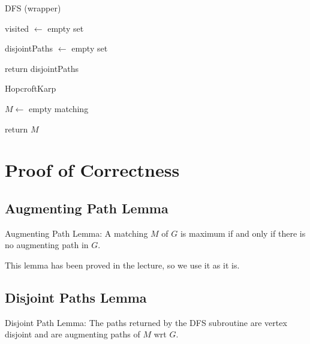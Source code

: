 \documentclass{article}
\begin{document}
\begin{algorithm}[!h]
\caption{DFS (wrapper)}

visited $\leftarrow$ empty set

disjointPaths $\leftarrow$ empty set

return disjointPaths
\end{algorithm}

\begin{algorithm}[!h]
\caption{HopcroftKarp}

$M \leftarrow$ empty matching

return $M$
\end{algorithm}


\section{Proof of Correctness}
\subsection{Augmenting Path Lemma}
Augmenting Path Lemma: A matching $M$ of $G$ is maximum if and only if there is no augmenting path in $G$.

This lemma has been proved in the lecture, so we use it as it is.

\subsection{Disjoint Paths Lemma}
Disjoint Path Lemma: The paths returned by the DFS subroutine are vertex disjoint and are augmenting paths of $M$ wrt $G$.
\end{document}
